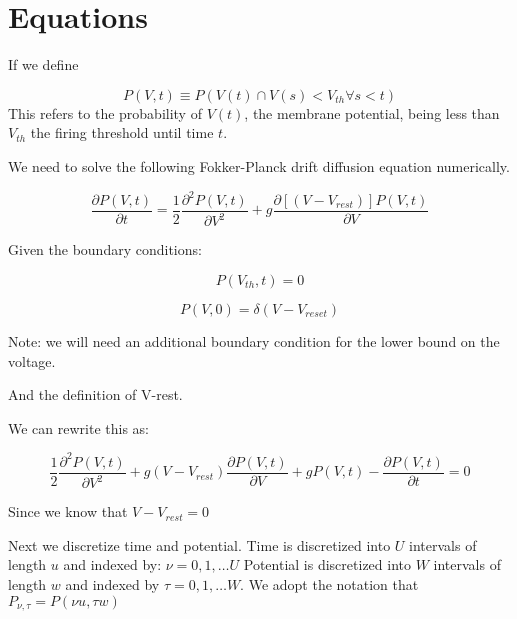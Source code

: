 \documentclass[10pt]{article}
\begin{document}
 

\section{Equations}

If we define

\begin{equation}
    P(V,t) \equiv P(V(t) \cap  V(s) < V_{th} \forall s < t)
\end{equation}
This refers to the probability of $V(t)$, the membrane potential,
being less than $V_{th}$ the firing threshold until time $t$.  


We need to solve the following Fokker-Planck drift diffusion equation
numerically.

\begin{equation}
    \frac{\partial P(V,t)}{\partial t} =
    \frac{1}{2} \frac{\partial^2 P(V,t) } {\partial V^2} +
    g\frac{\partial[(V-V_{rest})]P(V,t)}{\partial V}
\end{equation}

Given the boundary conditions:
 
\begin{equation}
    P(V_{th},t) = 0
\end{equation}

\begin{equation}
    P(V,0) = \delta(V-V_{reset})
\end{equation}

Note: we will need an additional boundary condition for the lower
bound on the voltage.

And the definition of V-rest.


We can rewrite this as:

\begin{equation}
    \frac{1}{2} \frac{\partial^2 P(V,t) } {\partial V^2} +
    g(V-V_{rest})\frac{\partial P(V,t)}{\partial V} +
    gP(V,t) -
    \frac{\partial P(V,t)}{\partial t} = 
    0
\end{equation}

Since we know that $ V-V_{rest} = 0 $


Next we discretize time and potential. Time is discretized  into $U$
intervals of length $u$ and indexed by: $\nu= 0,1, \dots U $ Potential
is discretized into $W$ intervals of length $w$ and indexed by $\tau= 0,1,
\dots W $. We adopt the notation that $P_{\nu,\tau} = P(\nu u,\tau w)$ 
\end{document}
